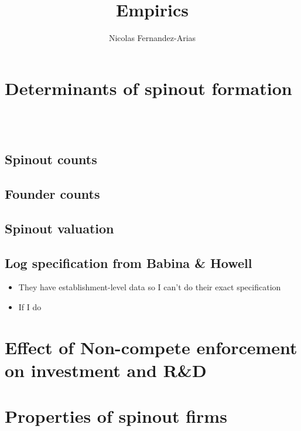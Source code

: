 \documentclass[12pt,english]{article}
\theoremstyle{remark}
\begin{document}
	
\title{Empirics}
\author{Nicolas Fernandez-Arias}
\maketitle

\section{Determinants of spinout formation}

 \\
 \\



\subsection{Spinout counts}
\scriptsize


\subsection{Founder counts}




\subsection{Spinout valuation}




\subsection{Log specification from Babina \& Howell}

\begin{itemize}
	\item They have establishment-level data so I can't do their exact specification
	\item If I do 
\end{itemize}


\section{Effect of Non-compete enforcement on investment and R\&D}







\section{Properties of spinout firms}
\end{document}
